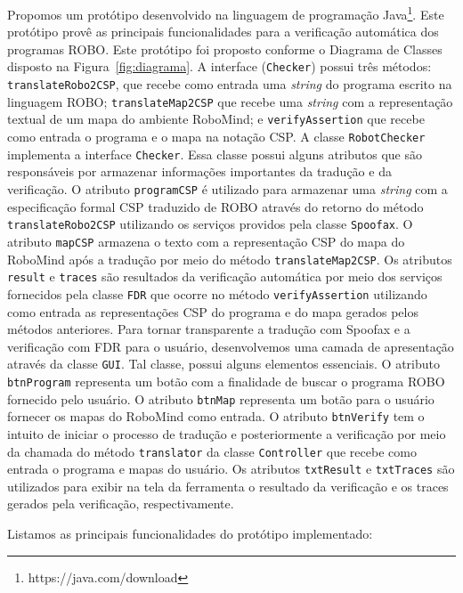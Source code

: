 Propomos um protótipo desenvolvido na linguagem de programação Java\footnote[7]{https://java.com/download}. Este protótipo provê as principais funcionalidades para a verificação automática dos programas ROBO. Este protótipo foi proposto conforme o Diagrama de Classes disposto na Figura~\ref{fig:diagrama}. A interface (\texttt{Checker}) possui três métodos: \texttt{translateRobo2CSP}, que recebe como entrada uma \textit{string} do programa escrito na linguagem ROBO; \texttt{translateMap2CSP} que recebe uma \textit{string} com a representação textual de um mapa do ambiente RoboMind; e \texttt{verifyAssertion} que recebe como entrada o programa e o mapa na notação CSP. A classe \texttt{RobotChecker} implementa a interface \texttt{Checker}. Essa classe possui alguns atributos que são responsáveis por armazenar informações importantes da tradução e da verificação. O atributo \texttt{programCSP} é utilizado para armazenar uma \textit{string} com a especificação formal CSP traduzido de ROBO através do retorno do método \texttt{translateRobo2CSP} utilizando os serviços providos pela classe \texttt{Spoofax}. O atributo \texttt{mapCSP} armazena o texto com a representação CSP do mapa do RoboMind após a tradução por meio do método \texttt{translateMap2CSP}. Os atributos \texttt{result} e \texttt{traces} são resultados da verificação automática por meio dos serviços fornecidos pela classe \texttt{FDR} que ocorre no método \texttt{verifyAssertion} utilizando como entrada as representações CSP do programa e do mapa gerados pelos métodos anteriores. Para tornar transparente a tradução com Spoofax e a verificação com FDR para o usuário, desenvolvemos uma camada de apresentação através da classe \texttt{GUI}. Tal classe, possui alguns elementos essenciais. O atributo \texttt{btnProgram} representa um botão com a finalidade de buscar o programa ROBO fornecido pelo usuário. O atributo \texttt{btnMap} representa um botão para o usuário fornecer os mapas do RoboMind como entrada. O atributo \texttt{btnVerify} tem o intuito de iniciar o processo de tradução e posteriormente a verificação por meio da chamada do método \texttt{translator} da classe \texttt{Controller} que recebe como entrada o programa e mapas do usuário. Os atributos \texttt{txtResult} e \texttt{txtTraces} são utilizados para exibir na tela da ferramenta o resultado da verificação e os traces gerados pela verificação, respectivamente.

Listamos as principais funcionalidades do protótipo implementado:


